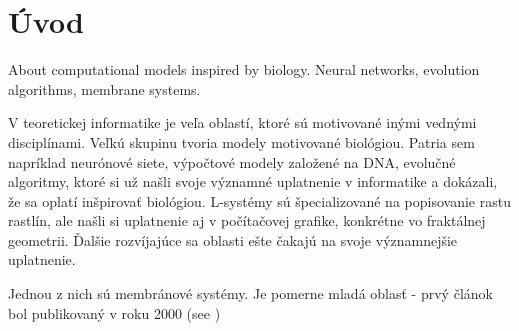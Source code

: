 \chapter*{Úvod}

About computational models inspired by biology. Neural networks, evolution algorithms, membrane systems.

V teoretickej informatike je veľa oblastí, ktoré sú motivované inými vednými
disciplínami. Veľkú skupinu tvoria modely motivované biológiou. Patria sem
napríklad neurónové siete, výpočtové modely založené na DNA, evolučné algoritmy, ktoré
si už našli svoje významné uplatnenie v informatike a dokázali, že sa oplatí
inšpirovať biológiou. L-systémy sú špecializované na popisovanie rastu rastlín, ale našli si uplatnenie aj v počítačovej grafike, konkrétne vo fraktálnej geometrii. Ďalšie rozvíjajúce sa oblasti ešte čakajú na svoje významnejšie uplatnenie.

Jednou z nich sú membránové systémy. Je pomerne mladá oblasť - prvý článok
bol publikovaný v roku 2000 (see \cite{Paun2000108})
